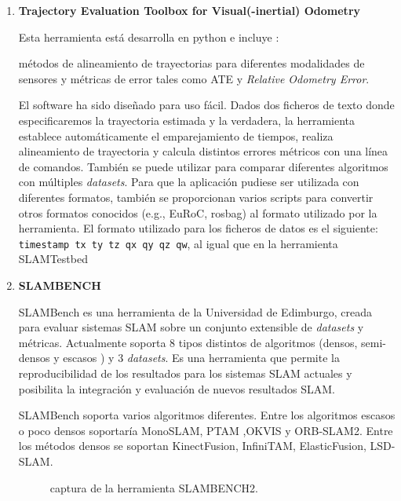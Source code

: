 \begin {enumerate}


\item \textbf{Trajectory Evaluation Toolbox for Visual(-inertial) Odometry}

Esta herramienta está desarrolla en python e incluye : 

métodos de alineamiento de trayectorias para diferentes modalidades de sensores y métricas de error tales como ATE y \textit{Relative Odometry Error}. \cite{Zhang18iros}

El software ha sido diseñado para uso fácil. Dados dos ficheros de texto donde especificaremos la trayectoria estimada y la verdadera, la herramienta establece automáticamente el emparejamiento de tiempos, realiza alineamiento de trayectoria y calcula distintos errores métricos con una línea de comandos. También se puede utilizar para comparar diferentes algoritmos con múltiples \textit{datasets}. Para que la aplicación pudiese ser utilizada con diferentes formatos, también se proporcionan varios scripts para convertir otros formatos conocidos (e.g., EuRoC, rosbag) al formato utilizado por la herramienta.
El formato utilizado para los ficheros de datos es el siguiente: \texttt{timestamp tx ty tz qx qy qz qw}, al igual que en la herramienta SLAMTestbed

\item \textbf{SLAMBENCH}

SLAMBench es una herramienta de la Universidad de Edimburgo, creada para evaluar sistemas SLAM sobre un conjunto extensible de \textit{datasets} y métricas. \cite{Bodin2018}
Actualmente soporta 8 tipos distintos de algoritmos (densos, semi-densos y escasos ) y 3 \textit{datasets}. Es una herramienta que permite la reproducibilidad de los resultados para los sistemas SLAM actuales y posibilita la integración y evaluación de nuevos resultados SLAM.

SLAMBench soporta varios algoritmos diferentes. Entre los algoritmos escasos o poco densos soportaría MonoSLAM, PTAM ,OKVIS y ORB-SLAM2. Entre los métodos densos se soportan KinectFusion, InfiniTAM, ElasticFusion, LSD-SLAM.
\begin{figure}[H]
\begin{center}
\end{center}
\caption{captura de la herramienta SLAMBENCH2.}
\end{figure}


\end{enumerate}
